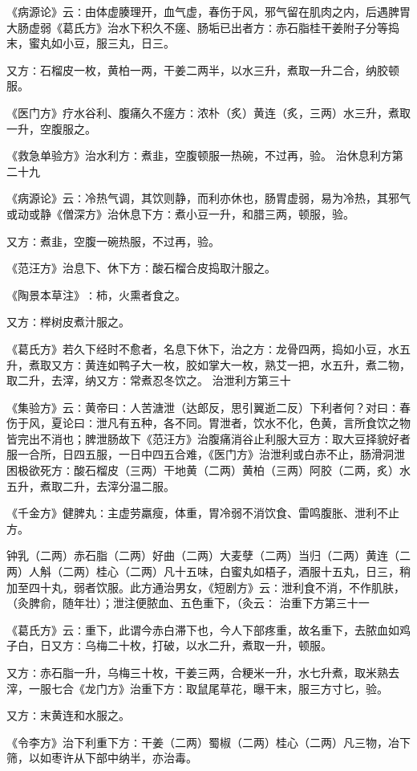 \documentclass[a4paper,12pt,UTF8,twoside]{ctexbook}
\begin{document}
《病源论》云∶由体虚腠理开，血气虚，春伤于风，邪气留在肌肉之内，后遇脾胃大肠虚弱《葛氏方》治水下积久不瘥、肠垢已出者方∶赤石脂桂干姜附子分等捣末，蜜丸如小豆，服三丸，日三。

又方∶石榴皮一枚，黄柏一两，干姜二两半，以水三升，煮取一升二合，纳胶顿服。

《医门方》疗水谷利、腹痛久不瘥方∶浓朴（炙）黄连（炙，三两）水三升，煮取一升，空腹服之。

《救急单验方》治水利方∶煮韭，空腹顿服一热碗，不过再，验。
治休息利方第二十九

《病源论》云∶冷热气调，其饮则静，而利亦休也，肠胃虚弱，易为冷热，其邪气或动或静《僧深方》治休息下方∶煮小豆一升，和腊三两，顿服，验。

又方∶煮韭，空腹一碗热服，不过再，验。

《范汪方》治息下、休下方∶酸石榴合皮捣取汁服之。

《陶景本草注》∶柿，火熏者食之。

又方∶榉树皮煮汁服之。

《葛氏方》若久下经时不愈者，名息下休下，治之方∶龙骨四两，捣如小豆，水五升，煮取又方∶黄连如鸭子大一枚，胶如掌大一枚，熟艾一把，水五升，煮二物，取二升，去滓，纳又方∶常煮忍冬饮之。
治泄利方第三十

《集验方》云∶黄帝曰∶人苦溏泄（达郎反，思引翼逝二反）下利者何？对曰∶春伤于风，夏论曰∶泄凡有五种，各不同。胃泄者，饮水不化，色黄，言所食饮之物皆完出不消也；脾泄肠故下《范汪方》治腹痛消谷止利服大豆方∶取大豆择貌好者服一合所，日四五服，一日中四五合难，《医门方》治泄利或白赤不止，肠滑洞泄困极欲死方∶酸石榴皮（三两）干地黄（二两）黄柏（三两）阿胶（二两，炙）水五升，煮取二升，去滓分温二服。

《千金方》健脾丸∶主虚劳羸瘦，体重，胃冷弱不消饮食、雷鸣腹胀、泄利不止方。

钟乳（二两）赤石脂（二两）好曲（二两）大麦孽（二两）当归（二两）黄连（二两）人斛（二两）桂心（二两）凡十五味，白蜜丸如梧子，酒服十五丸，日三，稍加至四十丸，弱者饮服。此方通治男女，《短剧方》云∶泄利食不消，不作肌肤，（灸脾俞，随年壮）；泄注便脓血、五色重下，（灸云∶
治重下方第三十一

《葛氏方》云∶重下，此谓今赤白滞下也，今人下部疼重，故名重下，去脓血如鸡子白，日又方∶乌梅二十枚，打破，以水二升，煮取一升，顿服。

又方∶赤石脂一升，乌梅三十枚，干姜三两，合粳米一升，水七升煮，取米熟去滓，一服七合《龙门方》治重下方∶取鼠尾草花，曝干末，服三方寸匕，验。

又方∶末黄连和水服之。

《令李方》治下利重下方∶干姜（二两）蜀椒（二两）桂心（二两）凡三物，冶下筛，以如枣许从下部中纳半，亦治毒。
\end{document}
